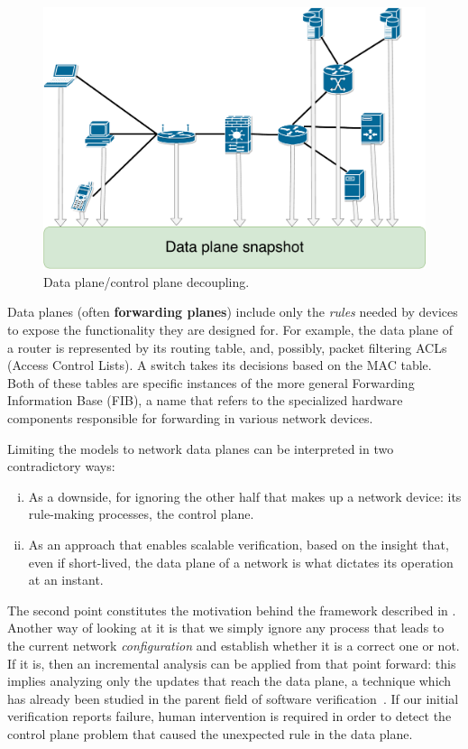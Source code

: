 \begin{figure}[h]
  \centering
  \captionsetup{justification=centering}
  \includegraphics[scale=0.3]{assets/img/data-plane-snapshot}
  \caption{Data plane/control plane decoupling.}
  \label{fig:data-plane-snapshot}
\end{figure}

Data planes (often \textbf{forwarding planes}) include only the \emph{rules}
needed by devices to expose the functionality they are designed for.  For
example, the data plane of a router is represented by its routing table, and,
possibly, packet filtering ACLs (Access Control Lists).  A switch takes its decisions based on the MAC table. Both of these tables are specific instances of the more
general Forwarding Information Base (FIB), a name that refers to the specialized hardware components responsible
for forwarding in various network devices.

Limiting the models to network data planes can be interpreted in two
contradictory ways:
\begin{enumerate}[(i)]
  \item As a downside, for ignoring the other half that makes up a network
    device: its rule-making processes, the control plane.
  \item As an approach that enables scalable verification, based on the insight
    that, even if short-lived, the data plane of a network is what dictates its
    operation at an instant.
\end{enumerate}

The second point constitutes the motivation behind the framework described in
.  Another way of looking at it is that
we simply ignore any process that leads to the current network
\emph{configuration} and establish whether it is a correct one or not.  If it
is, then an incremental analysis can be applied from that point forward: this
implies analyzing only the updates that reach the data plane, a technique which
has already been studied in the parent field of software
verification~\cite{marinescu2013katch}.  If our initial verification reports
failure, human intervention is required in order to detect the control plane
problem that caused the unexpected rule in the data plane.


